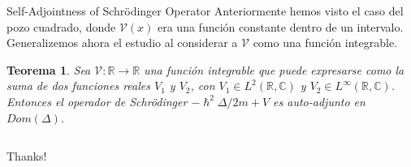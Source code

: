 \documentclass[aspectratio=1610]{beamer}
\newcommand*{\field}[1]{\mathbb{#1}}
\newtheorem*{teo}{Teorema}
\begin{document}
\begin{frame}{Self-Adjointness of Schrödinger Operator}
Anteriormente hemos visto el caso del pozo cuadrado, donde $\mathcal{V}(x)$ era una función constante dentro de un intervalo. Generalizemos ahora el estudio al considerar a $\mathcal{V}$ como una función integrable.
\begin{teo}
    Sea $\mathcal{V}:\field{R}\longrightarrow\field{R}$ una función integrable que puede expresarse como la suma de dos funciones reales $V_{1}$ y $V_{2}$, con $V_{1}\in L^{2}(\field{R},\field{C})$ y $V_{2}\in L^{\infty}(\field{R},\field{C})$. Entonces el operador de Schrödinger $-\hslash^2 \Delta/2m + V$ es auto-adjunto en $Dom(\Delta)$.
    \label{teo:SCOperator}
\end{teo}
    
\end{frame}



\begin{frame}
\begin{columns}
\column{37em}
\vspace{1cm}
\Huge{\centerline{Thanks!}}
\end{columns}
\end{frame}
\end{document}
